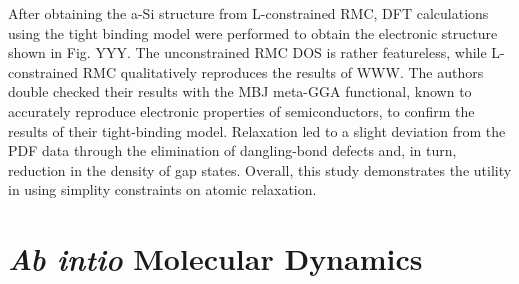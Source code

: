 \documentclass[3p,review,12pt]{elsarticle}
\begin{document}
\par 
After obtaining the a-Si structure from L-constrained RMC, DFT calculations using the tight binding model were performed to obtain the electronic structure shown in Fig. YYY. The unconstrained RMC DOS is rather featureless, while L-constrained RMC qualitatively reproduces the results of WWW. The authors double checked their results with the MBJ meta-GGA functional, known to accurately reproduce electronic properties of semiconductors, to confirm the results of their tight-binding model. Relaxation led to a slight deviation from the PDF data through the elimination of dangling-bond defects and, in turn, reduction in the density of gap states. Overall, this study demonstrates the utility in using simplity constraints on atomic relaxation.


















\section{\emph{Ab intio} Molecular Dynamics}
\end{document}
